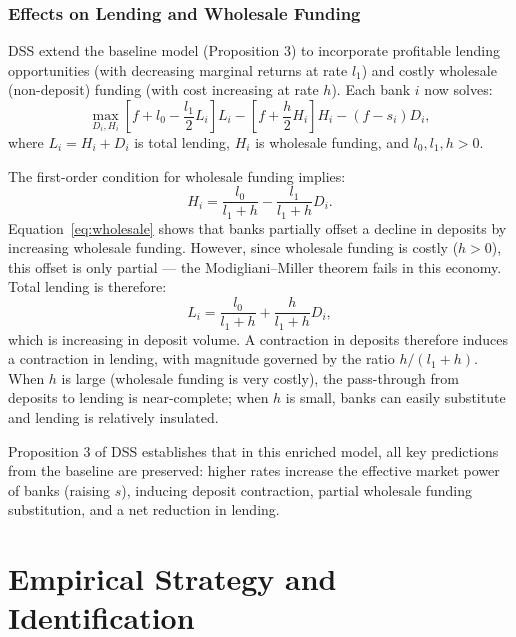 \documentclass[12pt,a4paper]{article}
\begin{document}
\subsubsection{Effects on Lending and Wholesale Funding}

DSS extend the baseline model (Proposition 3) to incorporate profitable
lending opportunities (with decreasing marginal returns at rate $l_1$) and
costly wholesale (non-deposit) funding (with cost increasing at rate $h$).
Each bank $i$ now solves:
\begin{equation}
  \max_{D_i, H_i} \left[ f + l_0 - \frac{l_1}{2} L_i \right] L_i
  - \left[ f + \frac{h}{2} H_i \right] H_i - (f - s_i) D_i,
  \label{eq:bankproblem}
\end{equation}
where $L_i = H_i + D_i$ is total lending, $H_i$ is wholesale funding, and
$l_0, l_1, h > 0$.

The first-order condition for wholesale funding implies:
\begin{equation}
  H_i = \frac{l_0}{l_1 + h} - \frac{l_1}{l_1 + h} D_i.
  \label{eq:wholesale}
\end{equation}
Equation~\eqref{eq:wholesale} shows that banks partially offset a decline in
deposits by increasing wholesale funding. However, since wholesale funding is
costly ($h > 0$), this offset is only partial --- the Modigliani--Miller
theorem fails in this economy. Total lending is therefore:
\begin{equation}
  L_i = \frac{l_0}{l_1 + h} + \frac{h}{l_1 + h} D_i,
  \label{eq:lending}
\end{equation}
which is increasing in deposit volume. A contraction in deposits therefore
induces a contraction in lending, with magnitude governed by the ratio
$h/(l_1 + h)$. When $h$ is large (wholesale funding is very costly), the
pass-through from deposits to lending is near-complete; when $h$ is small,
banks can easily substitute and lending is relatively insulated.

Proposition 3 of DSS establishes that in this enriched model, all key
predictions from the baseline are preserved: higher rates increase the
effective market power of banks (raising $s$), inducing deposit contraction,
partial wholesale funding substitution, and a net reduction in lending.

\section{Empirical Strategy and Identification}
\label{sec:empirical}
\end{document}
